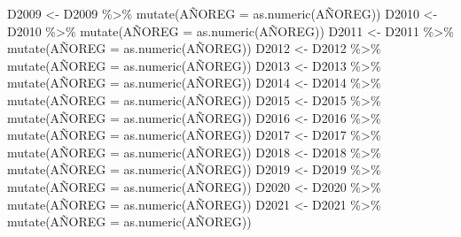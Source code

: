 \documentclass[
]{article}
\newenvironment{Shaded}{\begin{snugshade}}{\end{snugshade}}
\newcommand{\FunctionTok}[1]{\textcolor[rgb]{0.00,0.00,0.00}{#1}}
\newcommand{\NormalTok}[1]{#1}
\newcommand{\OtherTok}[1]{\textcolor[rgb]{0.56,0.35,0.01}{#1}}
\newcommand{\SpecialCharTok}[1]{\textcolor[rgb]{0.00,0.00,0.00}{#1}}
\begin{document}
\begin{Shaded}
\begin{Highlighting}[]
\NormalTok{D2009 }\OtherTok{\textless{}{-}}\NormalTok{ D2009 }\SpecialCharTok{\%\textgreater{}\%} \FunctionTok{mutate}\NormalTok{(AÑOREG }\OtherTok{=} \FunctionTok{as.numeric}\NormalTok{(AÑOREG))}
\NormalTok{D2010 }\OtherTok{\textless{}{-}}\NormalTok{ D2010 }\SpecialCharTok{\%\textgreater{}\%} \FunctionTok{mutate}\NormalTok{(AÑOREG }\OtherTok{=} \FunctionTok{as.numeric}\NormalTok{(AÑOREG))}
\NormalTok{D2011 }\OtherTok{\textless{}{-}}\NormalTok{ D2011 }\SpecialCharTok{\%\textgreater{}\%} \FunctionTok{mutate}\NormalTok{(AÑOREG }\OtherTok{=} \FunctionTok{as.numeric}\NormalTok{(AÑOREG))}
\NormalTok{D2012 }\OtherTok{\textless{}{-}}\NormalTok{ D2012 }\SpecialCharTok{\%\textgreater{}\%} \FunctionTok{mutate}\NormalTok{(AÑOREG }\OtherTok{=} \FunctionTok{as.numeric}\NormalTok{(AÑOREG))}
\NormalTok{D2013 }\OtherTok{\textless{}{-}}\NormalTok{ D2013 }\SpecialCharTok{\%\textgreater{}\%} \FunctionTok{mutate}\NormalTok{(AÑOREG }\OtherTok{=} \FunctionTok{as.numeric}\NormalTok{(AÑOREG))}
\NormalTok{D2014 }\OtherTok{\textless{}{-}}\NormalTok{ D2014 }\SpecialCharTok{\%\textgreater{}\%} \FunctionTok{mutate}\NormalTok{(AÑOREG }\OtherTok{=} \FunctionTok{as.numeric}\NormalTok{(AÑOREG))}
\NormalTok{D2015 }\OtherTok{\textless{}{-}}\NormalTok{ D2015 }\SpecialCharTok{\%\textgreater{}\%} \FunctionTok{mutate}\NormalTok{(AÑOREG }\OtherTok{=} \FunctionTok{as.numeric}\NormalTok{(AÑOREG))}
\NormalTok{D2016 }\OtherTok{\textless{}{-}}\NormalTok{ D2016 }\SpecialCharTok{\%\textgreater{}\%} \FunctionTok{mutate}\NormalTok{(AÑOREG }\OtherTok{=} \FunctionTok{as.numeric}\NormalTok{(AÑOREG))}
\NormalTok{D2017 }\OtherTok{\textless{}{-}}\NormalTok{ D2017 }\SpecialCharTok{\%\textgreater{}\%} \FunctionTok{mutate}\NormalTok{(AÑOREG }\OtherTok{=} \FunctionTok{as.numeric}\NormalTok{(AÑOREG))}
\NormalTok{D2018 }\OtherTok{\textless{}{-}}\NormalTok{ D2018 }\SpecialCharTok{\%\textgreater{}\%} \FunctionTok{mutate}\NormalTok{(AÑOREG }\OtherTok{=} \FunctionTok{as.numeric}\NormalTok{(AÑOREG))}
\NormalTok{D2019 }\OtherTok{\textless{}{-}}\NormalTok{ D2019 }\SpecialCharTok{\%\textgreater{}\%} \FunctionTok{mutate}\NormalTok{(AÑOREG }\OtherTok{=} \FunctionTok{as.numeric}\NormalTok{(AÑOREG))}
\NormalTok{D2020 }\OtherTok{\textless{}{-}}\NormalTok{ D2020 }\SpecialCharTok{\%\textgreater{}\%} \FunctionTok{mutate}\NormalTok{(AÑOREG }\OtherTok{=} \FunctionTok{as.numeric}\NormalTok{(AÑOREG))}
\NormalTok{D2021 }\OtherTok{\textless{}{-}}\NormalTok{ D2021 }\SpecialCharTok{\%\textgreater{}\%} \FunctionTok{mutate}\NormalTok{(AÑOREG }\OtherTok{=} \FunctionTok{as.numeric}\NormalTok{(AÑOREG))}
\end{Highlighting}
\end{Shaded}
\end{document}

